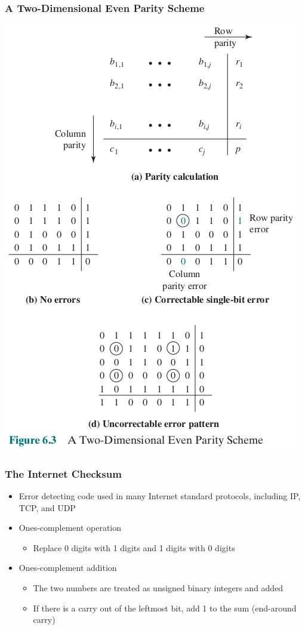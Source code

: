\documentclass[pdflatex,compress]{beamer}
\begin{document}
\begin{frame}
	\frametitle{A Two-Dimensional Even Parity Scheme}
	\begin{center}
		\includegraphics[height=0.8\textheight]{img/img03}
	\end{center}
\end{frame}

\begin{frame}
	\frametitle{The Internet Checksum}
	\begin{itemize}
		\item Error detecting code used in many Internet standard protocols, including IP, TCP, and UDP
		\item Ones-complement operation
		\begin{itemize}
			\item Replace 0 digits with 1 digits and 1 digits with 0 digits
		\end{itemize}
		\item Ones-complement addition
		\begin{itemize}
			\item The two numbers are treated as unsigned binary integers and added
			\item If there is a carry out of the leftmost bit, add 1 to the sum (end-around carry)
		\end{itemize}
	\end{itemize}
\end{frame}
\end{document}
